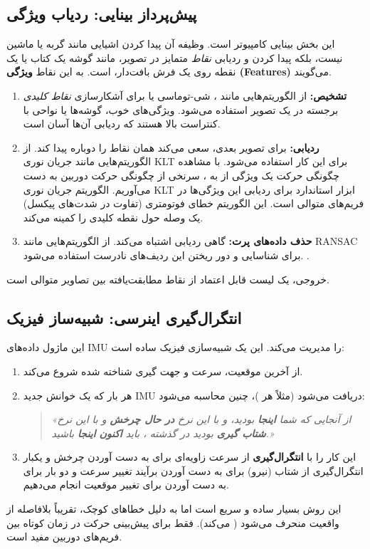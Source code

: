 \documentclass[11pt, a4paper]{article}
\begin{document}
	\subsection{پیش‌پرداز بینایی: ردیاب ویژگی}
	این بخش بینایی کامپیوتر است. وظیفه آن پیدا کردن اشیایی مانند گربه یا ماشین نیست، بلکه پیدا کردن و ردیابی \emph{نقاط} متمایز در تصویر، مانند گوشه یک کتاب یا یک نقطه روی یک فرش بافت‌دار، است. به این نقاط \textbf{ویژگی (Features)} می‌گویند.
	\begin{enumerate}
		\item \textbf{تشخیص:}  از الگوریتم‌هایی مانند
		، شی-توماسی یا  برای آشکارسازی \emph{نقاط کلیدی} برجسته در یک تصویر استفاده می‌شود. ویژگی‌های خوب، گوشه‌ها یا نواحی با کنتراست بالا هستند که ردیابی آن‌ها آسان است.
		\item \textbf{ردیابی:} برای تصویر بعدی، سعی می‌کند همان نقاط را دوباره پیدا کند. از الگوریتم‌هایی مانند جریان نوری \gls{KLT} برای این کار استفاده می‌شود. با مشاهده چگونگی حرکت یک ویژگی از  به ، سرنخی از چگونگی حرکت دوربین به دست می‌آوریم.  الگوریتم جریان نوری  \gls{KLT} ابزار استاندارد برای ردیابی این ویژگی‌ها در فریم‌های متوالی است. این الگوریتم خطای فوتومتری (تفاوت در شدت‌های پیکسل) یک وصله حول نقطه کلیدی را کمینه می‌کند.
		\item \textbf{حذف داده‌های پرت:} گاهی ردیابی اشتباه می‌کند. از الگوریتم‌هایی مانند \gls{RANSAC} برای شناسایی و دور ریختن این ردیف‌های نادرست استفاده می‌شود. .
	\end{enumerate}
	خروجی، یک لیست قابل اعتماد از نقاط مطابقت‌یافته بین تصاویر متوالی است. 
	
	\subsection{انتگرال‌گیری اینرسی: شبیه‌ساز فیزیک}
	این ماژول داده‌های IMU را مدیریت می‌کند. این یک شبیه‌سازی فیزیک ساده است:
	\begin{enumerate}
		\item از آخرین موقعیت، سرعت و جهت گیری شناخته شده شروع می‌کند.
		\item هر بار که یک خوانش جدید IMU دریافت می‌شود (مثلاً هر )، چنین محاسبه می‌شود:
		\begin{quote}
			\textit{«از آنجایی که شما \textbf{اینجا} بودید، و با این نرخ \textbf{در حال چرخش} و با این نرخ \textbf{شتاب گیری} بودید در  گذشته ، باید \textbf{اکنون} \textbf{اینجا} باشید.»}
		\end{quote}
		\item این کار را با \textbf{انتگرال‌گیری}  از سرعت زاویه‌ای برای به دست آوردن چرخش و یکبار انتگرال‌گیری از شتاب  (نیرو) برای  به دست آوردن برآیند تغییر سرعت و دو بار برای به دست آوردن  برای تغییر موقعیت انجام می‌دهیم.
	\end{enumerate}
	این روش بسیار ساده و سریع است اما به دلیل خطاهای کوچک، تقریباً بلافاصله از واقعیت منحرف می‌شود 
	(
	می‌کند). فقط برای پیش‌بینی حرکت در زمان کوتاه بین فریم‌های دوربین مفید است.
	
\end{document}
